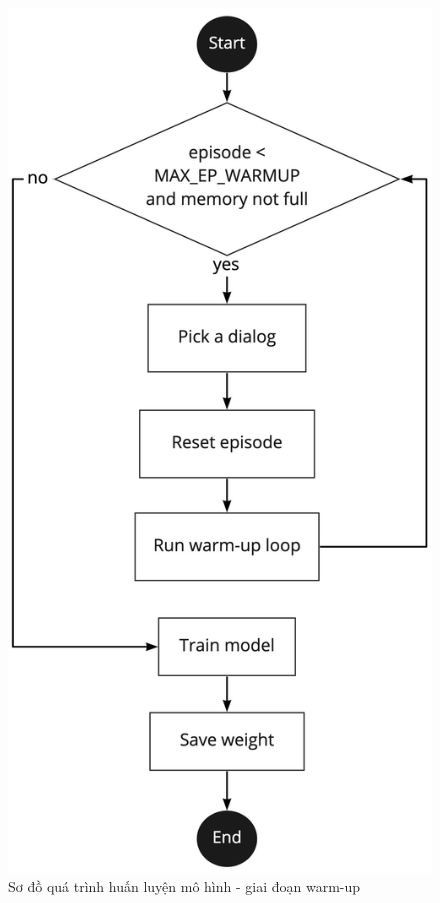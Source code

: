 \begin{figure}[ht!]
    \centering
    \includegraphics[scale=0.17]{thesis/chatbot/phuongphap/img/warmup_flow.jpg}
    \caption{Sơ đồ quá trình huấn luyện mô hình - giai đoạn warm-up}
    \label{fig:warmupflow}
\end{figure}

